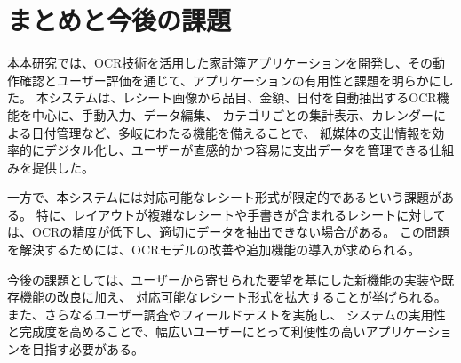 \documentclass[main]{subfiles}
\begin{document}
\chapter{まとめと今後の課題}
\label{cha:conclusion}

本本研究では、OCR技術を活用した家計簿アプリケーションを開発し、その動作確認とユーザー評価を通じて、アプリケーションの有用性と課題を明らかにした。
本システムは、レシート画像から品目、金額、日付を自動抽出するOCR機能を中心に、手動入力、データ編集、
カテゴリごとの集計表示、カレンダーによる日付管理など、多岐にわたる機能を備えることで、
紙媒体の支出情報を効率的にデジタル化し、ユーザーが直感的かつ容易に支出データを管理できる仕組みを提供した。

一方で、本システムには対応可能なレシート形式が限定的であるという課題がある。
特に、レイアウトが複雑なレシートや手書きが含まれるレシートに対しては、OCRの精度が低下し、適切にデータを抽出できない場合がある。
この問題を解決するためには、OCRモデルの改善や追加機能の導入が求められる。

今後の課題としては、ユーザーから寄せられた要望を基にした新機能の実装や既存機能の改良に加え、
対応可能なレシート形式を拡大することが挙げられる。また、さらなるユーザー調査やフィールドテストを実施し、
システムの実用性と完成度を高めることで、幅広いユーザーにとって利便性の高いアプリケーションを目指す必要がある。
\end{document}

